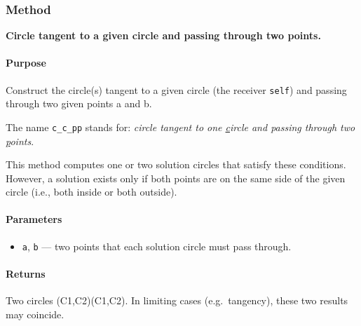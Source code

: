 
\begin{center}
\end{center}

\subsubsection{Method }
\label{ssub:method_c__c__pp}

\textbf{Circle tangent to a given circle and passing through two points.}

\medskip
\noindent
\paragraph*{Purpose}
Construct the circle(s) tangent to a given circle (the receiver \verb|self|) and passing through two given points a and b.

The name \verb|c_c_pp| stands for: \emph{circle tangent to one \underline{c}ircle and passing through two \underline{p}oints}.


\noindent
This method computes one or two solution circles that satisfy these conditions.
However, a solution exists only if both points are on the same side of the given circle (i.e., both inside or both outside).

\medskip
\noindent
\paragraph*{Parameters}
\begin{itemize}
\item \verb|a|, \verb|b| — two points that each solution circle must pass through.
\end{itemize}

\medskip
\noindent
\paragraph*{Returns}
Two circles (C1,C2)(C1,C2). In limiting cases (e.g.\ tangency), these two results may coincide.
